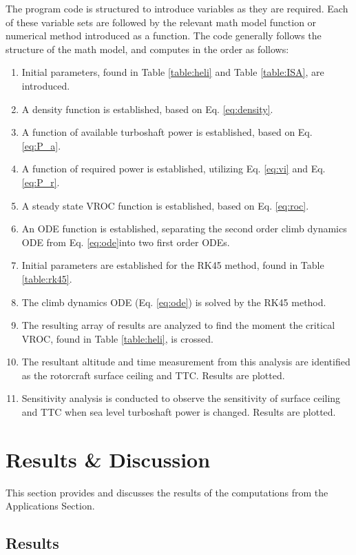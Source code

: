 \documentclass[12pt]{report}
\begin{document}
The program code is structured to introduce variables as they are required. Each of these variable sets are followed by the
relevant math model function or numerical method introduced as a function. The code generally follows the structure of the
math model, and computes in the order as follows:
\begin{enumerate}
    \item Initial parameters, found in Table \ref{table:heli} and Table \ref{table:ISA}, are introduced.
    \item A density function is established, based on Eq. \ref{eq:density}.
    \item A function of available turboshaft power is established, based on Eq. \ref{eq:P_a}.
    \item A function of required power is established, utilizing Eq. \ref{eq:vi} and Eq. \ref{eq:P_r}.
    \item A steady state VROC function is established, based on Eq. \ref{eq:roc}.
    \item An ODE function is established, separating the second order climb dynamics ODE from Eq. \ref{eq:ode}into two
    first order ODEs.
    \item Initial parameters are established for the RK45 method, found in Table \ref{table:rk45}.
    \item The climb dynamics ODE (Eq. \ref{eq:ode}) is solved by the RK45 method.
    \item The resulting array of results are analyzed to find the moment the critical VROC, found in Table \ref{table:heli},
    is crossed.
    \item The resultant altitude and time measurement from this analysis are identified as the rotorcraft surface ceiling and TTC.
    Results are plotted.
    \item Sensitivity analysis is conducted to observe the sensitivity of surface ceiling and TTC when sea level turboshaft power
    is changed. Results are plotted.
\end{enumerate}

\chapter{Results \& Discussion}

This section provides and discusses the results of the computations from the Applications Section.

\section{Results}
\end{document}
